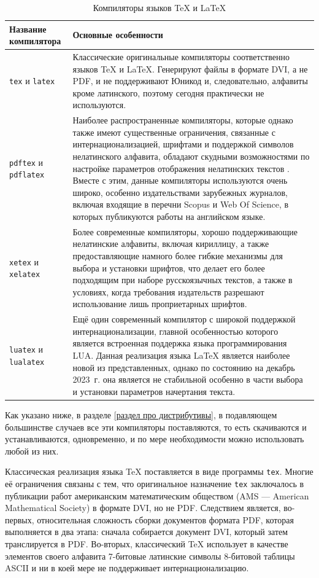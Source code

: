 \documentclass[workbook]{fefudoc}
\begin{document}
\begin{table}\small
\centering
\caption{Компиляторы языков \TeX{} и \LaTeX{}}
\label{таблица компиляторов}
\begin{tabularx}{\textwidth}{|l|X|}
\hline
\textbf{Название компилятора} & \textbf{Основные особенности} \\ \hline
\texttt{tex} и \texttt{latex} & Классические оригинальные компиляторы соответственно языков \TeX{} и \LaTeX{}. Генерируют файлы в формате DVI, а не PDF, и не поддерживают Юникод и, следовательно, алфавиты кроме латинского, поэтому сегодня практически не используются. \\ \hline
\texttt{pdftex} и \texttt{pdflatex} & Наиболее распространенные компиляторы, которые однако также имеют существенные ограничения, связанные с интернационализацией, шрифтами и поддержкой символов нелатинского алфавита, обладают скудными возможностями по настройке параметров отображения нелатинских текстов \cite{ПособиеLatex}. Вместе с этим, данные компиляторы используются очень широко, особенно издательствами зарубежных журналов, включая входящие в перечни Scopus и Web Of Science, в которых публикуются работы на английском языке. \\ \hline
\texttt{xetex} и \texttt{xelatex} & Более современные компиляторы, хорошо поддерживающие нелатинские алфавиты, включая кириллицу, а также предоставляющие намного более гибкие механизмы для выбора и установки шрифтов, что делает его более подходящим при наборе русскоязычных текстов, а также в условиях, когда требования издательств разрешают использование лишь проприетарных шрифтов. \\ \hline
\texttt{luatex} и \texttt{lualatex} & Ещё один современный компилятор с широкой поддержкой интернационализации, главной особенностью которого является встроенная поддержка языка программирования LUA. Данная реализация языка \LaTeX{} является наиболее новой из представленных, однако по состоянию на декабрь 2023~г. она является не стабильной особенно в части выбора и установки параметров начертания текста.\\ \hline
\end{tabularx}
\end{table}

Как указано ниже, в разделе \ref{раздел про дистрибутивы}, в подавляющем большинстве случаев все эти компиляторы поставляются, то есть скачиваются и устанавливаются, одновременно, и по мере необходимости можно использовать любой из них.

Классическая реализация языка \TeX{} поставляется в виде программы \texttt{tex}.
Многие её ограничения связаны с тем, что оригинальное назначение \texttt{tex} заключалось в публикации работ американским математическим обществом (AMS --- American Mathematical Society) в формате DVI, но не PDF.
Следствием является, во-первых, относительная сложность сборки документов формата PDF, которая выполняется в два этапа: сначала собирается документ DVI, который затем транслируется в PDF.
Во-вторых, классический \TeX{} использует в качестве элементов своего алфавита 7-битовые латинские символы 8-битовой таблицы ASCII и ни в коей мере не поддерживает интернационализацию.
\end{document}

